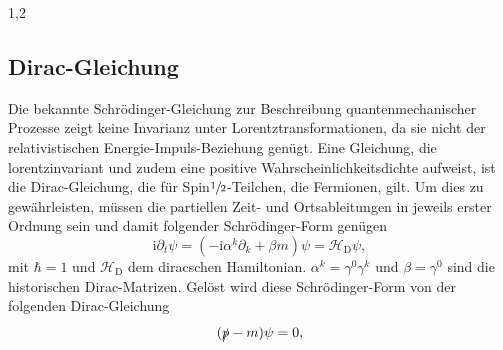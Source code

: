 \documentclass[11pt,a4paper,twoside,draft]{report}
\begin{document}
\begin{spacing}{1,2}
\subsection{Dirac-Gleichung}
Die bekannte Schrödinger-Gleichung zur Beschreibung quantenmechanischer Prozesse zeigt keine Invarianz unter Lorentztransformationen, da sie nicht der 
relativistischen Energie-Impuls-Beziehung genügt. Eine Gleichung, die lorentzinvariant und zudem eine positive Wahrscheinlichkeitsdichte aufweist, ist
die Dirac-Gleichung, die für Spin$\sfrac12$-Teilchen, die Fermionen, gilt. Um dies zu gewährleisten, müssen die partiellen Zeit- und Ortsableitungen in 
jeweils erster Ordnung sein und damit folgender Schrödinger-Form genügen \cite{RelQuantMech}
% 
\begin{equation}
 \text{i} \partial_t \psi = \left(-\text{i}\alpha^k\partial_k + \beta m\right)\psi = \mathcal{H}_\text{D} \psi,
 \label{eq_diracSchroedinger}
\end{equation}
mit $\hbar = 1$ und $\mathcal{H}_\text{D}$ dem diracschen Hamiltonian. $\alpha^k = \gamma^0\gamma^k$ und $\beta = \gamma^0$ sind die historischen Dirac-Matrizen. Gelöst wird
diese Schrödinger-Form von der folgenden Dirac-Gleichung
\begin{equation}
 (\slashed{p} - m )\psi = 0,
 \label{eq_dirac}
\end{equation}

\end{spacing}
\end{document}
